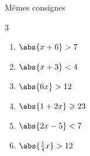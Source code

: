 \documentclass[main.tex]{subfiles}
\begin{document}
\vfill 
\begin{exercise}  \label{chapter04:exercice:inequation05}  Mêmes consignes \hfill 
	\vspace{-1em}
	\begin{multicols}{3}
		\begin{enumerate}[label={$(I_{\arabic*})$\rule{0pt}{1.4em}},leftmargin=*]
			\item $\abs{x+6}>7$
			\item $\abs{x+3}<4$
			\item $\abs{6x}>12$
			\item $\abs{1+2x}\geqslant 23$
			\item $\abs{2x-5}<7$
			\item $\abs{\tfrac{1}{4}x}>12$ 
		\end{enumerate}
	\end{multicols}  
\end{exercise}
\end{document}
